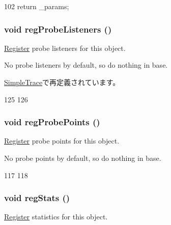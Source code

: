 \begin{DoxyCode}
102 { return _params; }
\end{DoxyCode}
\hypertarget{classSimObject_aa58a8221691801138d5d9236b8c3e0fb}{
\subsubsection[{regProbeListeners}]{\setlength{\rightskip}{0pt plus 5cm}void regProbeListeners ()}}
\label{classSimObject_aa58a8221691801138d5d9236b8c3e0fb}
\hyperlink{classRegister}{Register} probe listeners for this object.

No probe listeners by default, so do nothing in base. 

\hyperlink{classSimpleTrace_aa58a8221691801138d5d9236b8c3e0fb}{SimpleTrace}で再定義されています。


\begin{DoxyCode}
125 {
126 }
\end{DoxyCode}
\hypertarget{classSimObject_aa2dab17a363fd4307274d579796adcf7}{
\subsubsection[{regProbePoints}]{\setlength{\rightskip}{0pt plus 5cm}void regProbePoints ()}}
\label{classSimObject_aa2dab17a363fd4307274d579796adcf7}
\hyperlink{classRegister}{Register} probe points for this object.

No probe points by default, so do nothing in base. 


\begin{DoxyCode}
117 {
118 }
\end{DoxyCode}
\hypertarget{classSimObject_a4dc637449366fcdfc4e764cdf12d9b11}{
\subsubsection[{regStats}]{\setlength{\rightskip}{0pt plus 5cm}void regStats ()}}
\label{classSimObject_a4dc637449366fcdfc4e764cdf12d9b11}
\hyperlink{classRegister}{Register} statistics for this object. 

